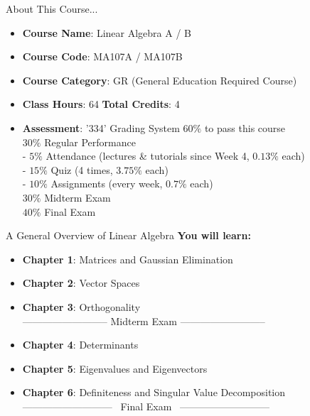 \documentclass{beamer}
\begin{document}
\begin{frame}{About This Course...}
\begin{itemize}
    \item \textbf{Course Name}: Linear Algebra A / B
    \item \textbf{Course Code}: MA107A / MA107B
    \item \textbf{Course Category}: GR (General Education Required Course)
    \item \textbf{Class Hours}: 64 \qquad \textbf{Total Credits}: 4
    \item \textbf{Assessment}: '334' Grading System \quad $60\%$ to pass this course\\
        \vspace{5pt}
        $30\%$ Regular Performance\\
        \vspace{3pt}
        \quad - $5\%$ Attendance (lectures \& tutorials since Week 4, $0.13\%$ each)\\
        \vspace{3pt}
        \quad - $15\%$ Quiz (4 times, $3.75\%$ each)\\
        \vspace{3pt}
        \quad - $10\%$ Assignments (every week, $0.7\%$ each)\\
        \vspace{3pt}
        $30\%$ Midterm Exam \\
        \vspace{3pt}
        $40\%$ Final Exam
\end{itemize}

\end{frame}
\begin{frame}{A General Overview of Linear Algebra}
\textbf{You will learn:}
\begin{itemize}
    \item \textbf{Chapter 1}: Matrices and Gaussian Elimination
    \item \textbf{Chapter 2}: Vector Spaces
    \item \textbf{Chapter 3}: Orthogonality\\
    \vspace{4pt}
-------------------------- Midterm Exam --------------------------
    \item \textbf{Chapter 4}: Determinants
    \item \textbf{Chapter 5}: Eigenvalues and Eigenvectors
    \item \textbf{Chapter 6}: Definiteness and Singular Value Decomposition
    \\
    \vspace{4pt}
--------------------------- \ Final Exam \ ---------------------------
\end{itemize}
\end{frame}
\end{document}
